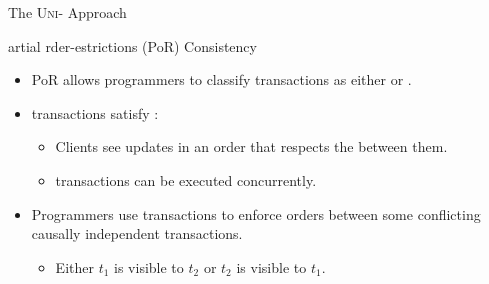 
\begin{frame}{The \textsc{Uni-} Approach}
  \begin{center}
    {artial rder-estrictions (PoR) Consistency} \\[3pt]
  \end{center}

  \pause
  \begin{itemize}
    \setlength{\itemsep}{8pt}
    \item PoR allows programmers to classify transactions as either 
          or . \pause
    \item {} transactions satisfy \cc:
          \begin{itemize}
            \item Clients see updates in an order that respects the 
                  between them. \\[3pt]
            \item {} transactions can be executed concurrently.
          \end{itemize}
          \pause
    \item Programmers use  transactions to enforce orders between
          some conflicting causally independent transactions.
          \begin{itemize}
            \item Either $t_{1}$ is visible to $t_{2}$ or $t_{2}$ is visible to $t_{1}$.
          \end{itemize}
  \end{itemize}
\end{frame}

